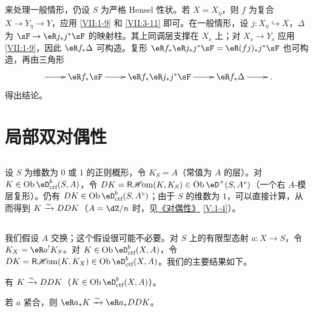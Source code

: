 \subsection{}\label{VII:3-12}

来处理一般情形，仍设 $S$ 为严格 Hensel 性状。若 $X=X_\eta$，则 $f$ 为复合 $X\to Y_\eta \to Y$，应用 \ref{VII:1-9} 和 \ref{VII:3-11} 即可。在一般情形，设 $j:X_\eta\hookrightarrow X$，$\Delta$ 为 $\sF \to \eR j_\ast j^\ast \sF$ 的映射柱。其上同调层支撑在 $X_s$ 上；对 $X_s \to Y_s$ 应用 \ref{VII:1-9}，因此 $\eR f_\ast \Delta$ 可构造。复形 $\eR f_\ast \eR j_\ast j^\ast \sF = \eR(f j)_\ast j^\ast \sF$ 也可构造，再由三角形
\[\xymatrix{
  \ar[r]
    & \eR f_\ast \sF \ar[r]
    & \eR f_\ast \eR j_\ast j^\ast \sF \ar[r]
    & \eR f_\ast \Delta \ar[r]
    & \text{.}
}\]
得出结论。

\section{局部双对偶性}\label{VII:4}

\subsection{}\label{VII:4-1}

设 $S$ 为维数为 $0$ 或 $1$ 的正则概形，令 $K_S=A$（常值为 $A$ 的层）。对 $K\in\ob\eD_\text{ctf}^b(S,A)$，令 $D K=\rHom(K,K_S)\in\ob\eD^+(S,A^\circ)$（一个右 $A$-模层复形）。仍有 $D K\in\ob\eD_\text{ctf}^b(S,A^\circ)$；由于 $S$ 的维数为 $1$，可以直接计算，从而得到 $K\xrightarrow\sim D D K$（$A=\dZ/n$ 时，见\hyperref[V]{《对偶性》} \ref{V:1-4}）。

\subsection{}\label{VII:4-2}

我们假设 $A$ 交换；这个假设很可能不必要。对 $S$ 上的有限型态射 $a:X\to S$，令 $K_X=\eR a^! K_S$。对 $K\in\ob\eD_\text{ctf}^b(X,A)$，令 $D K=\rHom(K,K_X)\in\ob\eD_\text{ctf}^b(X,A)$。我们的主要结果如下。

\begin{theorem_}\label{VII:4-3}
有 $K\xrightarrow\sim D D K$（$K\in \ob\eD_\textnormal{ctf}^b(X,A)$）。
\end{theorem_}

\begin{lemma_}\label{VII:4-4}
若 $a$ 紧合，则 $\eR a_\ast K \iso \eR a_\ast D D K$。
\end{lemma_}

